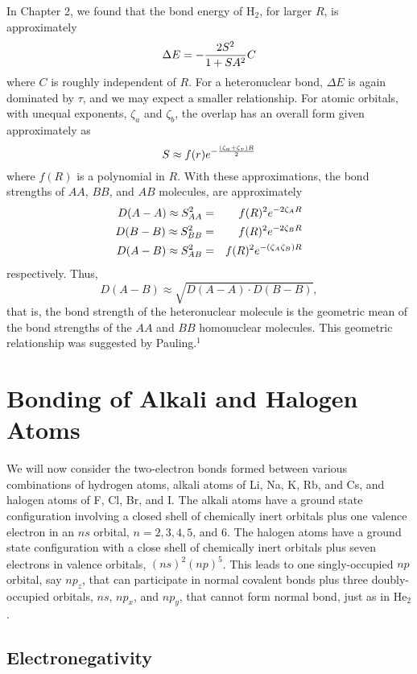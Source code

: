 In Chapter 2, we found that the bond energy of H$_2$, for larger $R$, is
approximately
\begin{equation}
\Delta E = - {2S^2 \over 1+SA^2}C
\end{equation}
where $C$ is roughly independent of $R$.  For a heteronuclear bond, 
$\Delta E$ is again dominated by $\tau$, and we may expect a smaller 
relationship.  For atomic orbitals, with unequal exponents, $\zeta_a$ 
and $\zeta_b$, the overlap has an overall form
given approximately as
\begin{equation}
S \approx f(r) e^{-{(\zeta_a + \zeta_v)R \over 2}}
\end{equation}
where $f(R)$ is a polynomial in $R$.  With these approximations, the bond
strengths of $AA$, $BB$, and $AB$ molecules, are approximately
\begin{eqnarray}
D(A-A) \approx S^2_{AA} &=& f(R)^2 e^{-2\zeta_AR}\cr
D(B-B) \approx S^2_{BB} &=& f(R)^2 e^{-2\zeta_BR}\cr
D(A-B) \approx S^2_{AB} &=& f(R)^2 e^{-(\zeta_A \zeta_B)R}
\end{eqnarray}
respectively. Thus,
\begin{equation}
D(A - B) \approx \sqrt{D(A - A) \cdot D(B - B)},
\end{equation}
that is, the bond strength of the heteronuclear molecule is the geometric
mean of the bond strengths of the $AA$ and $BB$ homonuclear molecules. This
geometric relationship was suggested by Pauling.$^1$

\section{Bonding of Alkali and Halogen Atoms}

We will now consider the two-electron bonds formed between various
combinations of hydrogen atoms, alkali atoms of Li, Na, K, Rb, and Cs,	
and halogen atoms of F, Cl, Br, and I. The alkali atoms have a ground
state configuration involving a closed shell of chemically inert orbitals 
plus one valence electron in an $ns$ orbital, $n = 2, 3, 4, 5$, and 
6.  The halogen atoms have a ground state configuration with a close 
shell of chemically inert orbitals plus seven electrons in valence 
orbitals, $(ns)^2 (np)^5$.  This leads to one singly-occupied $np$ orbital, 
say $np_z$, that can participate in normal covalent
bonds plus three doubly-occupied orbitals, $ns$, $np_x$,
and $np_y$, that cannot form normal bond, just as in He$_2$.

\subsection{Electronegativity}

